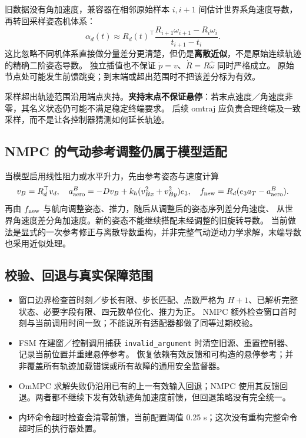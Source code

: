 \documentclass[UTF8,a4paper,11pt,fontset=fandol]{ctexart}
\newcommand{\code}[1]{{\small\nolinkurl{#1}}}
\begin{document}
旧数据没有角加速度，兼容器在相邻原始样本 $i,i+1$ 间估计世界系角速度导数，再转回采样姿态机体系：
\begin{equation}
 \alpha_d(t)\approx R_d(t)^\top
 \frac{R_{i+1}\omega_{i+1}-R_i\omega_i}{t_{i+1}-t_i}.
\end{equation}
这比忽略不同机体系直接做分量差分更清楚，但仍是\textbf{离散近似}，不是原始连续轨迹的精确二阶姿态导数。
独立插值也不保证 $\dot p=v$、$\dot R=R\widehat\omega$ 同时严格成立。
原始节点处可能发生前馈跳变；到末端或超出范围时不把该差分标为有效。

采样超出轨迹范围沿用端点夹持。\textbf{夹持末点不保证悬停}：若末点速度／角速度非零，其名义状态仍可能不满足稳定终端要求。
后续 omtraj 应负责合理终端及一致采样，而不是让各控制器猜测如何延长轨迹。

\subsection{NMPC 的气动参考调整仍属于模型适配}
当模型启用线性阻力或水平升力，先由参考姿态与速度计算
\begin{equation}
 v_B=R_d^\top v_d,\quad
 a_{\rm aero}^B=-D v_B+k_h(v_{Bx}^2+v_{By}^2)e_3,
 \quad f_{\rm new}=R_d(e_3a_T-a_{\rm aero}^B).
\end{equation}
再由 $f_{\rm new}$ 与航向调整姿态、推力，随后从调整后的姿态序列差分角速度、
从世界角速度差分角加速度。新的姿态不能继续搭配未经调整的旧旋转导数。
当前做法是显式的一次参考修正与离散导数重构，并非完整气动逆动力学求解，末端导数也采用近似处理。

\subsection{校验、回退与真实保障范围}
\begin{itemize}
\item 窗口边界检查首时刻／步长有限、步长匹配、点数严格为 $H+1$、已解析完整状态、必要字段有限、四元数单位化、推力为正。
NMPC 额外检查窗口首时刻与当前调用时间一致；不能说所有适配器都做了同等过期校验。
\item FSM 在建窗／控制调用捕获 \code{invalid_argument} 时清空旧源、重置控制器、记录当前位置并重建悬停参考。
恢复依赖有效反馈和可构造的悬停参考；并非覆盖所有轨迹加载错误或所有故障的通用安全监督器。
\item OmMPC 求解失败仍沿用已有的上一有效输入回退；NMPC 使用其反馈回退。两者都不继续下发有效轨迹角加速度前馈，但回退策略没有完全统一。
\item 内环命令超时检查会清零前馈，当前配置阈值 0.25 s；这次没有重构完整命令超时后的执行器处置。
\end{itemize}
\clearpage
\end{document}
